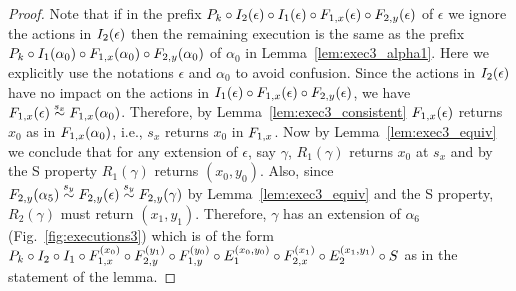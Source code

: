 {\begin{proof}
Note  that if  in the prefix
 $\finiteprefixA{k-1}{k}  \circ \frage{I_2}{\epsilon}{} \circ \frage{I_1}{\epsilon}{} \circ \frage{F_{1,x}}{\epsilon}{} \circ  \frage{F_{2,y}}{\epsilon}{}$  of $\epsilon$ 
we ignore the actions in $\frage{I_2}{\epsilon}{}$
 then the remaining execution is the same as the prefix  
 $\finiteprefixA{k-1}{k}  \circ  \frage{I_1}{\alpha_0}{} \circ \frage{F_{1,x}}{\alpha_0}{} \circ  \frage{F_{2,y}}{\alpha_0}{}$ of $\alpha_0$ in 
Lemma~\ref{lem:exec3_alpha1}. Here we explicitly use the notations $\epsilon$ and $\alpha_0$ to avoid confusion. Since the actions in 
$\frage{I_2}{\epsilon}{}$ have no impact on the actions in 
 $\frage{I_1}{\epsilon}{} \circ \frage{F_{1,x}}{\epsilon}{} \circ  \frage{F_{2,y}}{\epsilon}{}$,
we have $\frage{F_{1,x}}{\epsilon}{} \stackrel{s_x}{\sim} \frage{F_{1,x}}{\alpha_0}{}$. Therefore, by Lemma~\ref{lem:exec3_consistent} 
  $\frage{F_{1,x}}{\epsilon}{}$ returns $x_0$ as in  $\frage{F_{1,x}}{\alpha_0}{}$, i.e., $s_x$ returns $x_0$ in $\fragn{F_{1,x}}{\epsilon}{x_0}$. 
Now by Lemma~\ref{lem:exec3_equiv} we  conclude that 
for  any  extension of $\epsilon$, say $\gamma$, \rot{} 
 $R_1(\gamma)$ returns $x_0$ at $s_x$ and by the S property  $R_1(\gamma)$ returns  $(x_0, y_0)$. Also, since 
$\frage{F_{2,y}}{\alpha_5}{} \stackrel{s_y}{\sim} \frage{F_{2,y}}{\epsilon}{} \stackrel{s_y}{\sim} \frage{F_{2,y}}{\gamma}{}$  by Lemma~\ref{lem:exec3_equiv} and the S property,  $R_2(\gamma)$ must return $(x_1, y_1)$.  Therefore, $\gamma$ has an extension of $\alpha_6$ (Fig.~\ref{fig:executions3}) which is of  the form $ \finiteprefixA{k-1}{k}  \circ\fragt{I_2}{\alpha_6}{} \circ  \fragt{I_1}{\alpha_6}{} \circ\fragt{F_{1,x}}{\alpha_6}{x_0}
\circ\fragt{F_{2,y}}{\alpha_6}{y_1}\circ \fragt{F_{1,y}}{\alpha_6}{y_0} \circ\fragt{E_1}{\alpha_6}{x_0, y_0}
\circ\fragt{F_{2,x}}{\alpha_6}{x_1} \circ \fragt{E_2}{\alpha_6}{x_1, y_1}\circ \fragt{S}{\alpha_6}{}$ as in the statement of the lemma.
\end{proof}
}
